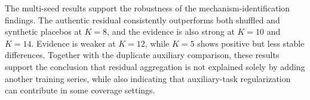 The multi-seed results support the robustness of the mechanism-identification findings. The authentic residual consistently outperforms both shuffled and synthetic placebos at \(K=8\), and the evidence is also strong at \(K=10\) and \(K=14\). Evidence is weaker at \(K=12\), while \(K=5\) shows positive but less stable differences. Together with the duplicate auxiliary comparison, these results support the conclusion that residual aggregation is not explained solely by adding another training series, while also indicating that auxiliary-task regularization can contribute in some coverage settings.
